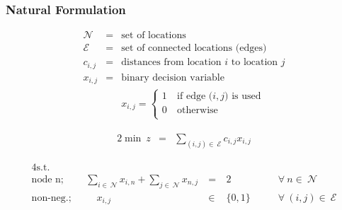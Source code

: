 \documentclass[10pt,handout,notes=show]{beamer}
\begin{document}
\begin{frame}
  \frametitle{Natural Formulation \forIE}

  \small{
    \begin{eqnarray*}
      \mathcal{N} &=& \mbox{set of locations}\\
      \mathcal{E} &=& \mbox{set of connected locations (edges)}\\
      c_{i,j}     &=& \mbox{distances from location $i$ to location $j$}\\
      x_{i,j}     &=& \mbox{binary decision variable}\\
                  & & x_{i,j} = \begin{cases}
                                1~& \mbox{if edge ($i,j$) is used}\\
                                0~& \mbox{otherwise}\\
                                \end{cases}
    \end{eqnarray*}


    \begin{alignat*}{2}
    \min\ z     & =& \sum_{(i,j) \in\ \mathcal{E} } c_{i,j} x_{i,j}
    \end{alignat*}

    \begin{alignat*}{4}
      \mbox{s.t.} & & & \\
      \mbox{node n;~~} &  \sum_{i \in\ \mathcal{N} } x_{i,n} + \sum_{j \in\ \mathcal{N} } x_{n,j} ~ &=\ & 2 & \qquad \forall\ n \in\ \mathcal{N}\\
      \mbox{non-neg.;~~}&  ~~~~~x_{i,j} &\in\ & \{0,1\} & \qquad \forall\ (i,j) \in\ \mathcal{E}
    \end{alignat*}
  }

\end{frame}
\end{document}
